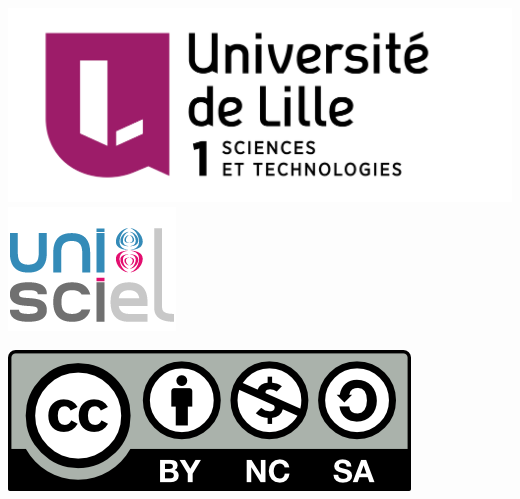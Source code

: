 





\begin{frame}

\thispagestyle{empty}    

  \hspace*{-20ex}
  \begin{minipage}{0.35\textwidth}
  \begin{center}
    \vspace*{5ex}   


    \bigskip

    \includegraphics[scale=0.13]{../divers/Logo-Univ-Lille-1-new.png}
    \quad
    \includegraphics[scale=0.3]{../divers/logo-unisciel.png}

    \vspace*{5ex}

    \includegraphics[scale=0.5]{../divers/by-nc-sa.png}
  \end{center}
  \end{minipage}
  \hfil
  \begin{minipage}{0.90\textwidth}
  \footnotesize
   \vspace*{2ex}



\end{minipage}
\end{frame}
